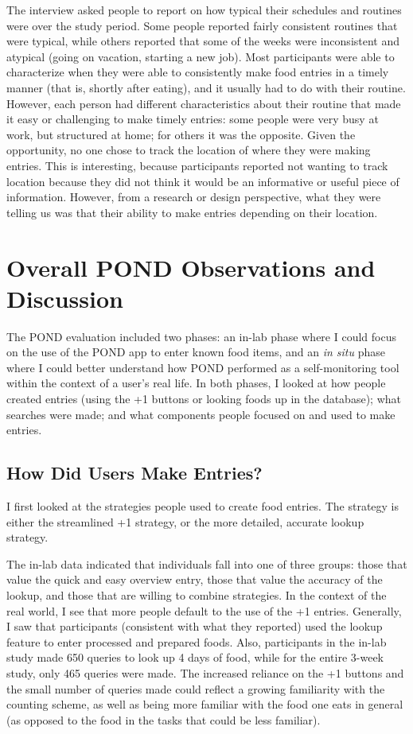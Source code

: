 The interview asked people to report on how typical their schedules and routines were over the study period. Some people reported fairly consistent routines that were typical, while others reported that some of the weeks were inconsistent and atypical (going on vacation, starting a new job). Most participants were able to characterize when they were able to consistently make food entries in a timely manner (that is, shortly after eating), and it usually had to do with their routine. However, each person had different characteristics about their routine that made it easy or challenging to make timely entries: some people were very busy at work, but structured at home; for others it was the opposite. Given the opportunity, no one chose to track the location of where they were making entries. This is interesting, because participants reported not wanting to track location because they did not think it would be an informative or useful piece of information. However, from a research or design perspective, what they were telling us was that their ability to make entries depending on their location. 

\section{Overall POND Observations and Discussion}
The POND evaluation included two phases: an in-lab phase where I could focus on the use of the POND app to enter known food items, and an \textit{in situ} phase where I could better understand how POND performed as a self-monitoring tool within the context of a user's real life. In both phases, I looked at how people created entries (using the +1 buttons or looking foods up in the database); what searches were made; and what components people focused on and used to make entries. 


\subsection{How Did Users Make Entries? }
I first looked at the strategies people used to create food entries. The strategy is either the streamlined +1 strategy, or the more detailed, accurate lookup strategy. 

The in-lab data indicated that individuals fall into one of three groups: those that value the quick and easy overview entry, those that value the accuracy of the lookup, and those that are willing to combine strategies. In the context of the real world, I see that more people default to the use of the +1 entries. Generally, I saw that participants (consistent with what they reported) used the lookup feature to enter processed and prepared foods. Also, participants in the in-lab study made 650 queries to look up 4 days of food, while for the entire 3-week study, only 465 queries were made. The increased reliance on the +1 buttons and the small number of queries made could reflect a growing familiarity with the counting scheme, as well as being more familiar with the food one eats in general (as opposed to the food in the tasks that could be less familiar). 

